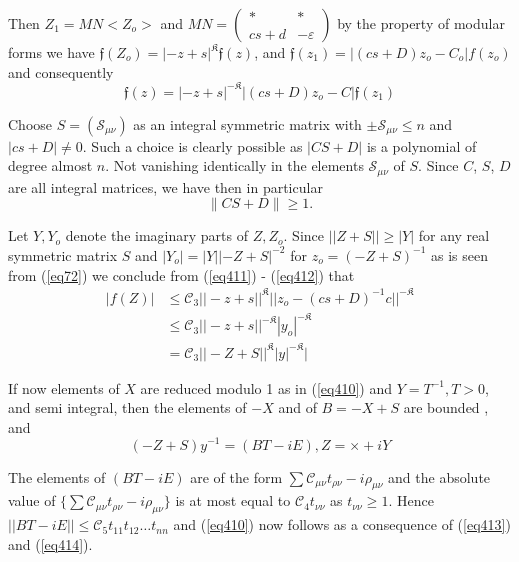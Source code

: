 Then $Z_1 = MN <Z_o> $ and $ MN = \begin{pmatrix}  * & * \\ cs+d &
  -\varepsilon \end{pmatrix} $ by the property of modular forms we
have $\mathfrak{f} (Z_o) = |-z+s|^\mathfrak{K} \mathfrak{f} (z)$, and
$\mathfrak{f}(z_1) = |(cs+D)z_o - C_o| f (z_o)$ and consequently  
\begin{equation*}
\mathfrak{f} (z) = |-z +s|^{-\mathfrak{K}} |(cs +D) z_o-C| \mathfrak{f}
(z_1) \tag{411}\label{eq411} 
\end{equation*}

Choose $S = (\mathscr{S}_{\mu \nu})$ as an integral symmetric matrix
with $\pm \mathscr{S}_{\mu \nu} \le n$ and $|cs+D| \neq 0$. Such a
choice is clearly possible as $|CS+D|$ is a polynomial of degree almost
$n$. Not vanishing identically in the elements $\mathscr{S}_{\mu \nu}$
of $S$. Since $C$, $S$, $D$ are all integral matrices, we have then in
particular  
\begin{equation*}
\| CS +D \| \ge 1. \tag{412}\label{eq412}
 \end{equation*} 
 
 Let $Y, Y_o$ denote the imaginary parts of $Z, Z_o$. Since $||Z +S||
 \ge |Y|$ for any real symmetric matrix $S$ and $|Y_o| = |Y|| -Z
 +S|^{-2}$ for $z_o = (-Z+S)^{-1}$ as is seen from (\ref{eq72}) we conclude
 from (\ref{eq411}) - (\ref{eq412})  that\pageoriginale   
 \begin{align*}
|f(Z)| & \le  \mathscr{C}_3 ||-z+s||^\mathfrak{K} ||z_o-(cs+D)^{-1}c
||^{-\mathfrak{K}} \\ 
& \le \mathscr{C}_3 ||-z+s||^{-\mathfrak{K}} |y_o|^{-\mathfrak{K}}\\
& = \mathscr{C}_3 ||-Z+S||^\mathfrak{K} |y|^{- \mathfrak{K}}
|\tag{413}\label{eq413} 
 \end{align*} 
 
 If now elements of $X$ are reduced modulo 1 as in (\ref{eq410}) and
 $Y=T^{-1}, T > 0$, and semi integral, then the elements of $-X$ and
 of $B=-X+S$  are bounded , and   
 \begin{equation*}
(-Z +S)y^{-1} = (BT -iE), Z= \times + i Y \tag{414}\label{eq414}
 \end{equation*} 
 
 The elements of $(BT- iE)$ are of the form $\sum \mathscr{C}_{\mu \nu}
 t _{\rho \nu} -i \rho _{\mu \nu}$ and the absolute value of $\{ \sum
 \mathscr{C}_{\mu \nu} t _{\rho \nu} -i \rho _{\mu \nu}\}$ is at most
 equal to $\mathscr{C}_4 t_{\nu \nu}$ as $t_{\nu \nu} \ge 1$. Hence
 $||BT -iE|| \le \mathscr{C}_5 t_{11} t_{12} \dots t_{nn}$ and (\ref{eq410})
 now follows as a consequence of (\ref{eq413}) and (\ref{eq414}).  
 
